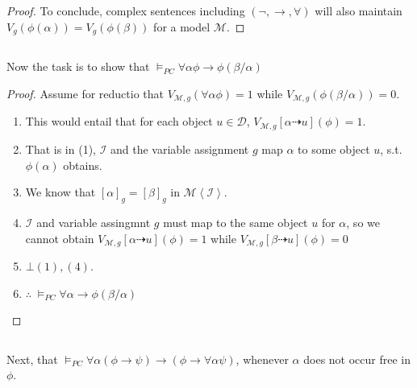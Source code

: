 \documentclass{article}
\begin{document}
\begin{proof}
        \noindent To conclude, complex sentences including $(\lnot, \rightarrow, \forall)$ will also maintain $V_g (\phi(\alpha)) = V_g (\phi(\beta))$ for a model $\mathscr{M}$.
    \end{proof}


    

    \subsection{}
    Now the task is to show that $\vDash_{PC} \forall \alpha \phi \rightarrow \phi(\beta / \alpha)$

    \begin{proof}
        Assume for reductio that $V_{\mathscr{M}, g} (\forall \alpha \phi) = 1$ while $V_{\mathscr{M}, g}(\phi(\beta / \alpha)) = 0$.
        \begin{enumerate}
            \item This would entail that for each object $u \in \mathscr{D}$, $V_{\mathscr{M}, g}[\alpha \dashrightarrow u](\phi) = 1$.
            \item That is in (1), $\mathscr{I}$ and the variable assignment $g$ map $\alpha$ to some object $u$, s.t. $\phi(\alpha)$ obtains.
            \item We know that $[\alpha]_g = [\beta]_g$ in $\mathscr{M}\left\langle \mathscr{I} \right\rangle$.
            \item $\mathscr{I}$ and variable assingmnt $g$ must map to the same object $u$ for $\alpha$, so we cannot obtain $V_{\mathscr{M}, g}[\alpha \dashrightarrow u](\phi) = 1$ while $V_{\mathscr{M}, g}[\beta \dashrightarrow u](\phi) =0$
            \item $\bot (1), (4)$.
            \item $\therefore \; \vDash_{PC} \forall \alpha \rightarrow \phi(\beta / \alpha)$
        \end{enumerate}
    \end{proof}

    \subsection{}
    Next, that $\vDash_{PC} \forall \alpha (\phi \rightarrow \psi) \rightarrow (\phi \rightarrow \forall \alpha \psi)$, whenever $\alpha$ does not occur free in $\phi$.
    
\end{document}

